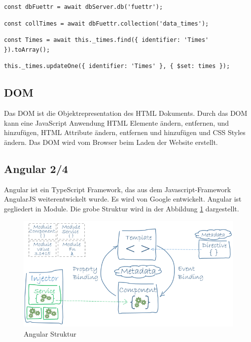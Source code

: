 \begin{lstlisting}[caption=Auswählen der Datenbank,style=TS]
const dbFuettr = await dbServer.db('fuettr');
\end{lstlisting}

\begin{lstlisting}[caption=Auswählen der Collection,style=TS]
const collTimes = await dbFuettr.collection('data_times');
\end{lstlisting}

\begin{lstlisting}[caption=Auslesen aller Datensätze mit einem Identifier,style=TS]
const Times = await this._times.find({ identifier: 'Times' }).toArray();
\end{lstlisting}

\begin{lstlisting}[caption=Überschreiben eines Datensatzes mit einem Identifier,style=TS]
this._times.updateOne({ identifier: 'Times' }, { $set: times });
\end{lstlisting}

\subsection{DOM}
\label{sec:vor-dom}
Das \ac{DOM} ist die Objektrepresentation des \ac{HTML} Dokuments. Durch das \ac{DOM} kann eine JavaScript Anwendung \ac{HTML} Elemente ändern, entfernen, und hinzufügen, \ac{HTML} Attribute ändern, entfernen und hinzufügen und \ac{CSS} Styles ändern. Das \ac{DOM} wird vom Browser beim Laden der Website erstellt. 

\subsection{Angular 2/4}
\label{sec:vor-angular}
Angular ist ein TypeScript Framework, das aus dem Javascript-Framework AngularJS weiterentwickelt wurde. Es wird von Google entwickelt. Angular ist gegliedert in Module. Die grobe Struktur wird in der Abbildung \ref{Angular Struktur} dargestellt.

\begin{figure}[H]
      \includegraphics[width=1\textwidth]{Bilder/Greistorfer/Angular}
      \caption{Angular Struktur}
      \label{Angular Struktur}
\end{figure}

